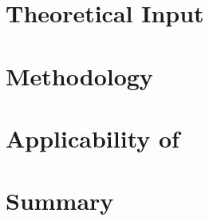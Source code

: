 \section{Theoretical Input}
\label{sec:theory}

%


\section{Methodology}
\label{sec:method}


\section{Applicability of \fitter}
\label{sec:examples}



\section{Summary}
\label{sec:outlook}





